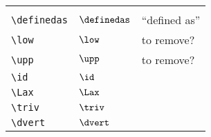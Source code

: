 \begin{longtable}{lll}
{{}%
}%
\\ 
 {\color[rgb]{0.5,0.5,0.5}\texttt{\textbackslash definedas}} & $\definedas$ &  ``defined as''\\ 
 {\color[rgb]{0.5,0.5,0.5}\texttt{\textbackslash low}} & $\low$ &  to remove?\\ 
 {\color[rgb]{0.5,0.5,0.5}\texttt{\textbackslash upp}} & $\upp$ &  to remove?\\ 
 {\color[rgb]{0.5,0.5,0.5}\texttt{\textbackslash id}} & $\id$ & \\ 
 {\color[rgb]{0.5,0.5,0.5}\texttt{\textbackslash Lax}} & $\Lax$ & \\ 
 {\color[rgb]{0.5,0.5,0.5}\texttt{\textbackslash triv}} & $\triv$ & \\ 
 {\color[rgb]{0.5,0.5,0.5}\texttt{\textbackslash dvert}} & $\dvert$ & \\ 
 \end{longtable}
